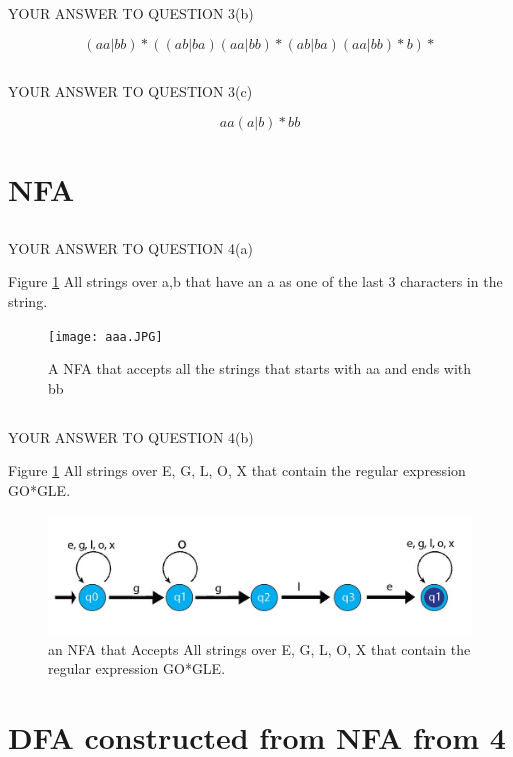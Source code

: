 \documentclass{article}
\begin{document}
\subsection{}
YOUR ANSWER TO QUESTION 3(b)

\[(aa|bb)*((ab|ba)(aa|bb)*(ab|ba)(aa|bb)*b)*\]


\subsection{}
YOUR ANSWER TO QUESTION 3(c)

\[aa(a|b)*bb\]

\section{NFA} 

\subsection{}
YOUR ANSWER TO QUESTION 4(a)

Figure \ref{fig:aaa} All strings over {a,b} that have an a as one of the last 3 characters in the string.
\begin{figure}
  \texttt{[image: aaa.JPG]}
  \caption{A NFA that accepts all the strings that starts with aa and ends with bb}
  \label{fig:aaa}
\end{figure}


\subsection{}
YOUR ANSWER TO QUESTION 4(b)

Figure \ref{fig:aaa} All strings over {E, G, L, O, X} that contain the regular expression GO*GLE.
\begin{figure}
  \includegraphics[width=\linewidth]{google.JPG}
  \caption{ an NFA that Accepts All strings over {E, G, L, O, X} that contain the regular expression GO*GLE.}
  \label{fig:google}
\end{figure}


\section{DFA constructed from NFA from 4} 
\end{document}
